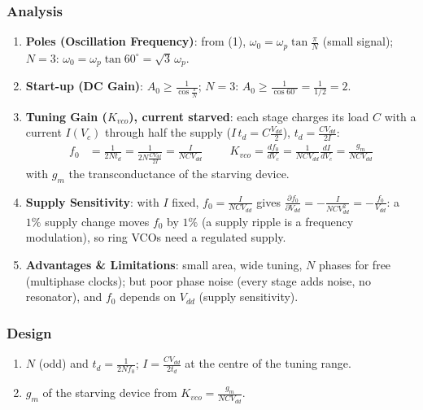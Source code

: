 \subsubsection{Analysis}
\begin{enumerate}
  \item \textbf{Poles (Oscillation Frequency)}: from (1), \(\omega_0 = \omega_p \tan\frac{\pi}{N}\) (small signal);
    \(N = 3\): \(\omega_0 = \omega_p\tan 60^\circ = \sqrt{3}\,\omega_p\).
  \item \textbf{Start-up (DC Gain)}: \(A_0 \geq \frac{1}{\cos\frac{\pi}{N}}\); \(N = 3\): \(A_0 \geq \frac{1}{\cos 60^\circ} = \frac{1}{1/2} = 2\).
  \item \textbf{Tuning Gain (\(K_{vco}\)), current starved}: each stage charges its load \(C\) with a current
\(I(V_c)\) through half the supply (\(I\,t_d = C\frac{V_{dd}}{2}\)), \(t_d = \frac{C V_{dd}}{2 I}\):
\begin{align*}
  f_0 &= \frac{1}{2N t_d} = \frac{1}{2N\frac{C V_{dd}}{2I}} = \frac{I}{N C V_{dd}} \hspace{1cm}
  K_{vco} = \frac{df_0}{dV_c} = \frac{1}{N C V_{dd}} \frac{dI}{dV_c} = \frac{g_m}{N C V_{dd}}
\end{align*}
with \(g_m\) the transconductance of the starving device.
  \item \textbf{Supply Sensitivity}: with \(I\) fixed, \(f_0 = \frac{I}{NCV_{dd}}\) gives
    \(\frac{\partial f_0}{\partial V_{dd}} = -\frac{I}{NCV_{dd}^2} = -\frac{f_0}{V_{dd}}\): a \(1\%\) supply change moves \(f_0\) by \(1\%\) (a supply ripple is
    a frequency modulation), so ring VCOs need a regulated supply.
  \item \textbf{Advantages \& Limitations}: small area, wide tuning, \(N\) phases for free (multiphase
    clocks); but poor phase noise (every stage adds noise, no resonator), and \(f_0\) depends on
    \(V_{dd}\) (supply sensitivity).
\end{enumerate}

\subsubsection{Design}
\begin{enumerate}
  \item \(N\) (odd) and \(t_d = \frac{1}{2 N f_0}\); \(I = \frac{C V_{dd}}{2 t_d}\) at the centre of the tuning range.
  \item \(g_m\) of the starving device from \(K_{vco} = \frac{g_m}{N C V_{dd}}\).
\end{enumerate}

